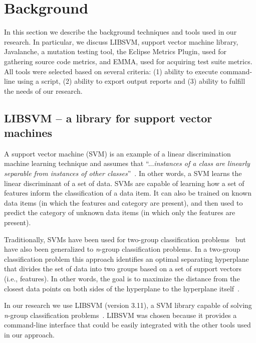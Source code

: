 \documentclass[conference]{IEEEtran}
\begin{document}
\section{Background}
\label{sec:background}
In this section we describe the background techniques and tools used in our research. In particular, we discuss LIBSVM, support vector machine library, Javalanche, a mutation testing tool, the Eclipse Metrics Plugin, used for gathering source code metrics, and EMMA, used for acquiring test suite metrics. All tools were selected based on several criteria: (1) ability to execute command-line using a script, (2) ability to export output reports and (3) ability to fulfill the needs of our research.


\subsection{LIBSVM -- a library for support vector machines}
\label{subsec:libsvm}
A support vector machine (SVM) is an example of a linear discrimination machine learning technique and assumes that ``...\emph{instances of a class are linearly separable from instances of other classes}''~\cite{ALP04}. In other words, a SVM learns the linear discriminant of a set of data. SVMs are capable of learning how a set of features inform the classification of a data item. It can also be trained on known data items (in which the features and category are present), and then used to predict the category of  unknown data items (in which only the features are present).

Traditionally, SVMs have been used for two-group classification problems~\cite{CV95} but have also been generalized to \emph{n}-group classification problems. In a two-group classification problem this approach identifies an optimal separating hyperplane that divides the set of data into two groups based on a set of support vectors (i.e., features). In other words, the goal is to maximize the distance from the closest data points on both sides of the hyperplane to the hyperplane itself~\cite{ALP04}.

In our research we use LIBSVM (version 3.11), a SVM library capable of solving \emph{n}-group classification problems~\cite{CL11}. LIBSVM was chosen because it provides a command-line interface that could be easily integrated with the other tools used in our approach.
\end{document}
